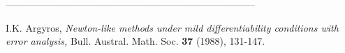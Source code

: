 \documentclass[10pt,a4paper]{article}
\begin{document}
\begin{center}
 -----------------------------------------------------------------------------
\end{center}
\begin{multicols}{2}
\begin{list}{}{\setlength{\topsep}{0mm}\setlength{\itemsep}{0mm}%
\setlength{\parsep}{0mm}\setlength{\leftmargin}{4mm}}
%
\small
\item[1.] I.K. Argyros, \textit{Newton-like methods under mild \linebreak differentiability conditions with error analysis,} Bull. \linebreak Austral. Math. Soc. \textbf{37} (1988), 131-147.
\item[2.]
%
\end{list}
\end{multicols}
\end{document}
